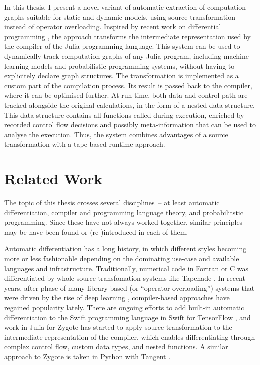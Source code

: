 In this thesis, I present a novel variant of automatic extraction of computation graphs suitable for
static and dynamic models, using source transformation instead of operator overloading.  Inspired by
recent work on differential programming \parencite{innes2018don}, the approach transforms the
intermediate representation used by the compiler of the Julia programming language.  This system can
be used to dynamically track computation graphs of any Julia program, including machine learning
models and probabilistic programming systems, without having to explicitely declare graph
structures. The transformation is implemented as a custom part of the compilation process.  Its
result is passed back to the compiler, where it can be optimised further. At run time, both data and
control path are tracked alongside the original calculations, in the form of a nested data
structure.  This data structure contains all functions called during execution, enriched by recorded
control flow decisions and possibly meta-information that can be used to analyse the
execution. Thus, the system combines advantages of a source transformation with a tape-based runtime
approach.


\section{Related Work}
\label{sec:related-work}

The topic of this thesis crosses several disciplines~-- at least automatic differentiation, compiler
and programming language theory, and probabilitstic programming.  Since these have not always worked
together, similar principles may be have been found or (re-)introduced in each of them.

Automatic differentiation has a long history, in which different styles becoming more or less
fashionable depending on the dominating use-case and available languages and infrastructure.
Traditionally, numerical code in Fortran or C was differentiated by whole-source transfomation
systems like Tapenade \parencite{tapenadedevelopers2019tapenade}.  In recent years, after phase of
many library-based (or \enquote{operator overloading}) systems that were driven by the rise of deep
learning \parencite{abadi2015tensorflow,paszke2017automatic,neubig2017dynet,tokui2015chainer},
compiler-based approaches have regained popularity lately.  There are ongoing efforts to add
built-in automatic differentiation to the Swift programming language in Swift for TensorFlow
\parencite{tensorflowdevelopers2018swift}, and work in Julia for Zygote \parencite{innes2018don} has
started to apply source transformation to the intermediate representation of the compiler, which
enables differentiating through complex control flow, custom data types, and nested functions.  A
similar approach to Zygote is taken in Python with Tangent \parencite{vanmerrienboer2018tangent}.

